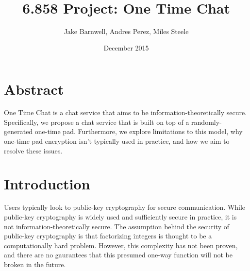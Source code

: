 \documentclass[twocolumn]{article}
\title{6.858 Project: One Time Chat}
\author{Jake Barnwell, Andres Perez, Miles Steele}
\date{December 2015}
\begin{document}
\maketitle










\section{Abstract}
One Time Chat is a chat service that aims to be information-theoretically secure. Specifically, we propose a chat service that is built on top of a randomly-generated one-time pad. Furthermore, we explore limitations to this model, why one-time pad encryption isn't typically used in practice, and how we aim to resolve these issues.

\section{Introduction}
Users typically look to public-key cryptography for secure communication. While public-key cryptography is widely used and sufficiently secure in practice, it is not information-theoretically secure. The assumption behind the security of public-key cryptography is that factorizing integers is thought to be a computationally hard problem. However, this complexity has not been proven, and there are no gaurantees that this presumed one-way function will not be broken in the future.
 
\end{document}
